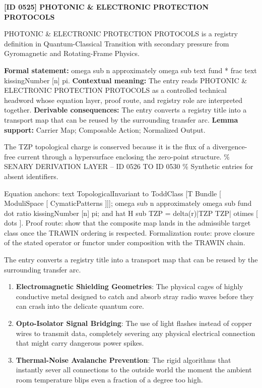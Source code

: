 \clearpage
\noindent\textbf{[ID 0525] PHOTONIC \& ELECTRONIC PROTECTION PROTOCOLS}\par
\vspace{0.35em}
\begingroup\small
{}
PHOTONIC \& ELECTRONIC PROTECTION PROTOCOLS is a registry definition in Quantum-Classical Transition with secondary pressure from Gyromagnetic and Rotating-Frame Physics.

\begingroup\footnotesize\setlength{\emergencystretch}{3em}\sloppy
\textbf{Formal statement:} omega sub n approximately omega sub text fund * frac text kissingNumber [n] pi. \textbf{Contextual meaning:} The entry reads PHOTONIC \& ELECTRONIC PROTECTION PROTOCOLS as a controlled technical headword whose equation layer, proof route, and registry role are interpreted together. \textbf{Derivable consequences:} The entry converts a registry title into a transport map that can be reused by the surrounding transfer arc. \textbf{Lemma support:} Carrier Map; Composable Action; Normalized Output.\par
\endgroup

The TZP topological charge is conserved because it is the flux of a divergence-free current through a hypersurface enclosing the zero-point structure. \% SENARY DERIVATION LAYER -- ID 0526 TO ID 0530 \% Synthetic entries for absent identifiers.

Equation anchors: text TopologicalInvariant to ToddClass [T Bundle [ ModuliSpace [ CymaticPatterns ]]]; omega sub n approximately omega sub fund dot ratio kissingNumber [n] pi; and hat H sub TZP = delta(r)|TZP TZP| otimes [ dots ]. Proof route: show that the composite map lands in the admissible target class once the TRAWIN ordering is respected. Formalization route: prove closure of the stated operator or functor under composition with the TRAWIN chain.

The entry converts a registry title into a transport map that can be reused by the surrounding transfer arc.
\endgroup

\begin{enumerate}[leftmargin=1.6em,itemsep=6pt,topsep=4pt]
\item \textbf{Electromagnetic Shielding Geometries}: The physical cages of highly conductive metal designed to catch and absorb stray radio waves before they can crash into the delicate quantum core.
\item \textbf{Opto-Isolator Signal Bridging}: The use of light flashes instead of copper wires to transmit data, completely severing any physical electrical connection that might carry dangerous power spikes.
\item \textbf{Thermal-Noise Avalanche Prevention}: The rigid algorithms that instantly sever all connections to the outside world the moment the ambient room temperature blips even a fraction of a degree too high.
\end{enumerate}

